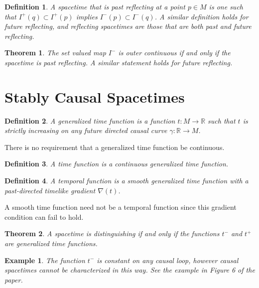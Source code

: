 \documentclass{article}
\theoremstyle{plain}
\newtheorem{theorem}{Theorem}[section]
\theoremstyle{thmit}
\theoremstyle{normal}
\newtheorem{example}{Example}[section]
\newtheorem{definition}{Definition}[section]
\begin{document}
        \begin{definition}
            A spacetime that is past reflecting at a point $p\in{M}$ is one
            such that $I^{+}(q)\subset{I}^{+}(p)$ implies
            $I^{-}(p)\subset{I}^{-}(q)$. A similar definition holds for
            future reflecting, and reflecting spacetimes are those that are both
            past and future reflecting.
        \end{definition}
        \begin{theorem}
            The set valued map $I^{-}$ is outer continuous if and only if
            the spacetime is past reflecting. A similar statement holds for
            future reflecting.
        \end{theorem}
    \section{Stably Causal Spacetimes}
        \begin{definition}
            A generalized time function is a function $t:M\rightarrow\mathbb{R}$
            such that $t$ is strictly increasing on any future directed
            causal curve $\gamma:\mathbb{R}\rightarrow{M}$.
        \end{definition}
        There is no requirement that a generalized time function be continuous.
        \begin{definition}
            A time function is a continuous generalized time function.
        \end{definition}
        \begin{definition}
            A temporal function is a smooth generalized time function with a
            past-directed timelike gradient $\nabla(t)$.
        \end{definition}
        A smooth time function need not be a temporal function since this
        gradient condition can fail to hold.
        \begin{theorem}
            A spacetime is distinguishing if and only if the functions
            $t^{-}$ and $t^{+}$ are generalized time functions.
        \end{theorem}
        \begin{example}
            The function $t^{-}$ is constant on any causal loop, however
            causal spacetimes cannot be characterized in this way. See the 
            example in Figure 6 of the paper.
        \end{example}
\end{document}
